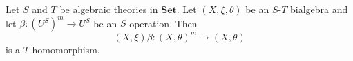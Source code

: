 Let $S$ and $T$ be algebraic theories in $\mathbf{Set}$. Let $(X, \xi, \theta)$ be an $S$-$T$ bialgebra and let $\beta: (U^S)^m \to U^S$ be an $S$-operation. Then
$$
(X, \xi)\beta: (X, \theta)^m \to (X, \theta)
$$
is a $T$-homomorphism.
